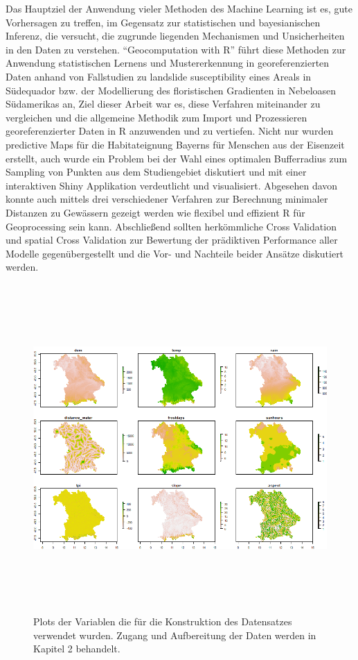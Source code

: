 Das Hauptziel der Anwendung vieler Methoden des Machine Learning ist es, gute Vorhersagen zu treffen, im Gegensatz zur statistischen und bayesianischen Inferenz, die versucht, die zugrunde liegenden Mechanismen und Unsicherheiten in den Daten zu verstehen. \cite{lovelace2019}
``Geocomputation with R'' führt diese Methoden zur Anwendung statistischen Lernens und Mustererkennung in georeferenzierten Daten anhand von Fallstudien zu landslide susceptibility eines Areals in Südequador bzw. der Modellierung des floristischen Gradienten in Nebeloasen Südamerikas an, Ziel dieser Arbeit war es, diese Verfahren miteinander zu vergleichen und die allgemeine Methodik zum Import und Prozessieren georeferenzierter Daten in R anzuwenden und zu vertiefen. Nicht nur wurden predictive Maps für die Habitateignung Bayerns für Menschen aus der Eisenzeit erstellt, auch wurde ein Problem bei der Wahl eines optimalen Bufferradius zum Sampling von Punkten aus dem Studiengebiet diskutiert und mit einer interaktiven Shiny \cite{shiny} Applikation verdeutlicht und visualisiert. Abgesehen davon konnte auch mittels drei verschiedener Verfahren zur Berechnung minimaler Distanzen zu Gewässern gezeigt werden wie flexibel und effizient R für Geoprocessing sein kann. Abschließend sollten herkömmliche Cross Validation und spatial Cross Validation zur Bewertung der prädiktiven Performance aller Modelle gegenübergestellt und die Vor- und Nachteile beider Ansätze diskutiert werden. 

\begin{figure}[H]
    \centering
    \includegraphics[width = 15cm, height = 12.5cm]{Figures/predictorstack.png}
    \caption{Plots der Variablen die für die Konstruktion des Datensatzes verwendet wurden. Zugang und Aufbereitung der Daten werden in Kapitel 2 behandelt.}
    \label{predictorstack}
\end{figure}